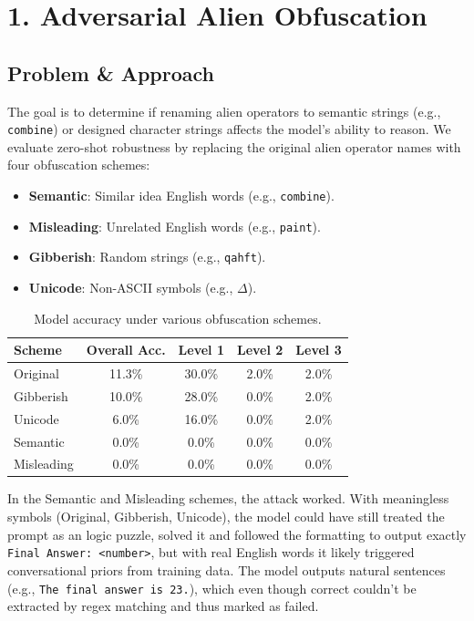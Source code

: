 \section*{1. Adversarial Alien Obfuscation}

\subsection*{Problem \& Approach}
The goal is to determine if renaming alien operators to semantic strings (e.g., \texttt{combine}) or designed character strings affects the model's ability to reason. We evaluate zero-shot robustness by replacing the original alien operator names with four obfuscation schemes:
\begin{itemize}
    \item \textbf{Semantic}: Similar idea English words (e.g., \texttt{combine}).
    \item \textbf{Misleading}: Unrelated English words (e.g., \texttt{paint}).
    \item \textbf{Gibberish}: Random strings (e.g., \texttt{qahft}).
    \item \textbf{Unicode}: Non-ASCII symbols (e.g., $\Delta$).
\end{itemize}

\begin{table}[h]
\centering
\begin{tabular}{l c c c c}
\toprule
\textbf{Scheme} & \textbf{Overall Acc.} & \textbf{Level 1} & \textbf{Level 2} & \textbf{Level 3} \\
\midrule
Original & 11.3\% & 30.0\% & 2.0\% & 2.0\% \\
Gibberish & 10.0\% & 28.0\% & 0.0\% & 2.0\% \\
Unicode & 6.0\% & 16.0\% & 0.0\% & 2.0\% \\
Semantic & 0.0\% & 0.0\% & 0.0\% & 0.0\% \\
Misleading & 0.0\% & 0.0\% & 0.0\% & 0.0\% \\
\bottomrule
\end{tabular}
\caption{Model accuracy under various obfuscation schemes.}
\label{tab:obfuscation_results}
\end{table}

In the Semantic and Misleading schemes, the attack worked.
With meaningless symbols (Original, Gibberish, Unicode), the model could have still treated the prompt as an logic puzzle, solved it and followed the formatting to output exactly \texttt{Final Answer: <number>}, but with real English words it likely triggered conversational priors from training data. The model outputs natural sentences (e.g., \texttt{The final answer is 23.}), which even though correct couldn't be extracted by regex matching and thus marked as failed. 
